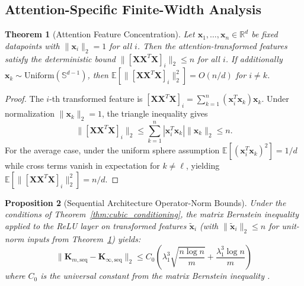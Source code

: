 \documentclass{article}
\theoremstyle{plain}
\newtheorem{theorem}{Theorem}[section]
\newtheorem{proposition}[theorem]{Proposition}
\theoremstyle{definition}
\theoremstyle{remark}
\newcommand{\R}{\mathbb{R}}
\newcommand{\E}{\mathbb{E}}
\begin{document}
\subsection{Attention-Specific Finite-Width Analysis}

\begin{theorem}[Attention Feature Concentration]
\label{thm:attention_concentration_app}
Let $\mathbf{x}_1, \ldots, \mathbf{x}_n \in \R^d$ be fixed datapoints with $\|\mathbf{x}_i\|_2 = 1$ for all $i$. Then the attention-transformed features satisfy the deterministic bound $\|[\mathbf{X}\mathbf{X}^T \mathbf{X}]_i\|_2 \leq n$ for all $i$. If additionally $\mathbf{x}_k \sim \mathrm{Uniform}(\mathbb{S}^{d-1})$, then $\E[\|[\mathbf{X}\mathbf{X}^T \mathbf{X}]_i\|_2^2] = O(n/d)$ for $i \neq k$.
\end{theorem}

\begin{proof}
The $i$-th transformed feature is $[\mathbf{X}\mathbf{X}^T \mathbf{X}]_i = \sum_{k=1}^n (\mathbf{x}_i^T \mathbf{x}_k) \mathbf{x}_k$. Under normalization $\|\mathbf{x}_k\|_2 = 1$, the triangle inequality gives
$$\|[\mathbf{X}\mathbf{X}^T \mathbf{X}]_i\|_2 \leq \sum_{k=1}^n |\mathbf{x}_i^T \mathbf{x}_k| \|\mathbf{x}_k\|_2 \leq n.$$
For the average case, under the uniform sphere assumption $\E[(\mathbf{x}_i^T \mathbf{x}_k)^2] = 1/d$ while cross terms vanish in expectation for $k \neq \ell$, yielding $\E[\|[\mathbf{X}\mathbf{X}^T \mathbf{X}]_i\|_2^2] = n/d$.
\end{proof}

\begin{proposition}[Sequential Architecture Operator-Norm Bounds]
\label{prop:seq_finite_width}
Under the conditions of Theorem~\ref{thm:cubic_conditioning}, the matrix Bernstein inequality applied to the ReLU layer on transformed features $\tilde{\mathbf{x}}_i$ (with $\|\tilde{\mathbf{x}}_i\|_2 \leq n$ for unit-norm inputs from Theorem~\ref{thm:attention_concentration_app}) yields:
$$\|\mathbf{K}_{m,\text{seq}} - \mathbf{K}_{\infty,\text{seq}}\|_2 \leq C_0\left(\lambda_1^3\sqrt{\frac{n\log n}{m}} + \frac{\lambda_1^3 \log n}{m}\right)$$
where $C_0$ is the universal constant from the matrix Bernstein inequality \citep{tropp2012user}.
\end{proposition}
\end{document}
